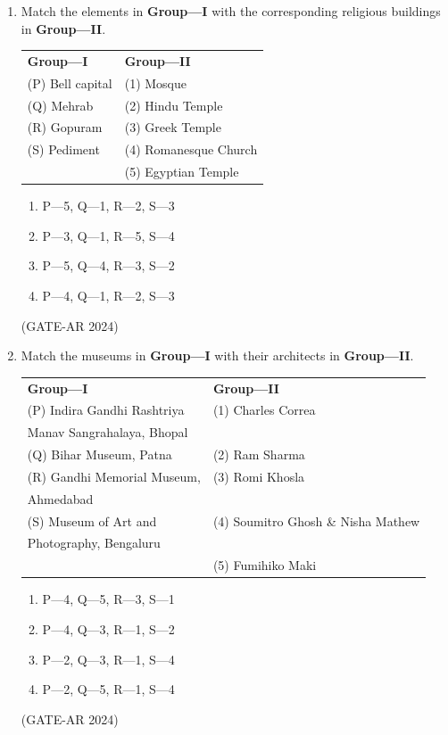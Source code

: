 \documentclass[a4paper,10pt]{article}
\begin{document}
\begin{enumerate}
    \item Match the elements in \textbf{Group—I} with the corresponding religious buildings in \textbf{Group—II}. \\
    \begin{tabular}{ l l }
    \textbf{Group—I} & \textbf{Group—II} \\
    (P) Bell capital & (1) Mosque \\
    (Q) Mehrab & (2) Hindu Temple \\
    (R) Gopuram & (3) Greek Temple \\
    (S) Pediment & (4) Romanesque Church \\
    & (5) Egyptian Temple \\
    \end{tabular}
    \begin{multicols}{2}
    \begin{enumerate}
        \item P—5, Q—1, R—2, S—3
        \item P—3, Q—1, R—5, S—4
        \item P—5, Q—4, R—3, S—2
        \item P—4, Q—1, R—2, S—3
    \end{enumerate}
    \end{multicols}
    \hfill (GATE-AR 2024)

    \item Match the museums in \textbf{Group—I} with their architects in \textbf{Group—II}. \\
    \begin{tabular}{ l l }
    \textbf{Group—I} & \textbf{Group—II} \\
    (P) Indira Gandhi Rashtriya & (1) Charles Correa \\
    Manav Sangrahalaya, Bhopal & \\
    (Q) Bihar Museum, Patna & (2) Ram Sharma \\
    (R) Gandhi Memorial Museum, & (3) Romi Khosla \\
    Ahmedabad & \\
    (S) Museum of Art and & (4) Soumitro Ghosh \& Nisha Mathew \\
    Photography, Bengaluru & \\
    & (5) Fumihiko Maki \\
    \end{tabular}
    \begin{multicols}{2}
    \begin{enumerate}
        \item P—4, Q—5, R—3, S—1
        \item P—4, Q—3, R—1, S—2
        \item P—2, Q—3, R—1, S—4
        \item P—2, Q—5, R—1, S—4
    \end{enumerate}
    \end{multicols}
    \hfill (GATE-AR 2024)


\end{enumerate}
\end{document}
